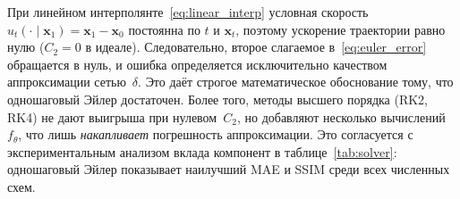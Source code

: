 При линейном интерполянте~\eqref{eq:linear_interp} условная скорость $u_t(\cdot\mid\mathbf{x}_1) = \mathbf{x}_1 - \mathbf{x}_0$ постоянна по $t$ и $\mathbf{x}_t$, поэтому ускорение траектории равно нулю ($C_2 = 0$ в идеале). Следовательно, второе слагаемое в~\eqref{eq:euler_error} обращается в нуль, и ошибка определяется исключительно качеством аппроксимации сетью~$\delta$. Это даёт строгое математическое обоснование тому, что одношаговый Эйлер достаточен. Более того, методы высшего порядка (RK2, RK4) не дают выигрыша при нулевом~$C_2$, но добавляют несколько вычислений~$f_\theta$, что лишь \emph{накапливает} погрешность аппроксимации. Это согласуется с экспериментальным анализом вклада компонент в таблице~\ref{tab:solver}: одношаговый Эйлер показывает наилучший MAE и SSIM среди всех численных схем.
